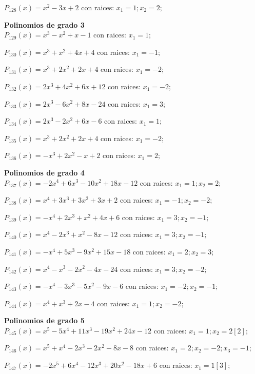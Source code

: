 \subitem $P_{128}(x) = x^2 - 3x + 2$ con raices: $x_1 = 1 ; x_2 = 2 ;  $

\textbf{Polinomios de grado 3\\} 
\subitem $P_{129}(x) = x^3 - x^2 + x - 1$ con raices: $x_1 = 1 ;  $

\subitem $P_{130}(x) = x^3 + x^2 + 4x + 4$ con raices: $x_1 = -1 ;  $

\subitem $P_{131}(x) = x^3 + 2x^2 + 2x + 4$ con raices: $x_1 = -2 ;  $

\subitem $P_{132}(x) = 2x^3 + 4x^2 + 6x + 12$ con raices: $x_1 = -2 ;  $

\subitem $P_{133}(x) = 2x^3 - 6x^2 + 8x - 24$ con raices: $x_1 = 3 ;  $

\subitem $P_{134}(x) = 2x^3 - 2x^2 + 6x - 6$ con raices: $x_1 = 1 ;  $

\subitem $P_{135}(x) = x^3 + 2x^2 + 2x + 4$ con raices: $x_1 = -2 ;  $

\subitem $P_{136}(x) = -x^3 + 2x^2 - x + 2$ con raices: $x_1 = 2 ;  $

\textbf{Polinomios de grado 4\\} 
\subitem $P_{137}(x) = -2x^4 + 6x^3 - 10x^2 + 18x - 12$ con raices: $x_1 = 1 ; x_2 = 2 ;  $

\subitem $P_{138}(x) = x^4 + 3x^3 + 3x^2 + 3x + 2$ con raices: $x_1 = -1 ; x_2 = -2 ;  $

\subitem $P_{139}(x) = -x^4 + 2x^3 + x^2 + 4x + 6$ con raices: $x_1 = 3 ; x_2 = -1 ;  $

\subitem $P_{140}(x) = x^4 - 2x^3 + x^2 - 8x - 12$ con raices: $x_1 = 3 ; x_2 = -1 ;  $

\subitem $P_{141}(x) = -x^4 + 5x^3 - 9x^2 + 15x - 18$ con raices: $x_1 = 2 ; x_2 = 3 ;  $

\subitem $P_{142}(x) = x^4 - x^3 - 2x^2 - 4x - 24$ con raices: $x_1 = 3 ; x_2 = -2 ;  $

\subitem $P_{143}(x) = -x^4 - 3x^3 - 5x^2 - 9x - 6$ con raices: $x_1 = -2 ; x_2 = -1 ;  $

\subitem $P_{144}(x) = x^4 + x^3 + 2x - 4$ con raices: $x_1 = 1 ; x_2 = -2 ;  $

\textbf{Polinomios de grado 5\\} 
\subitem $P_{145}(x) = x^5 - 5x^4 + 11x^3 - 19x^2 + 24x - 12$ con raices: $x_1 = 1 ; x_2 = 2[2] ;  $

\subitem $P_{146}(x) = x^5 + x^4 - 2x^3 - 2x^2 - 8x - 8$ con raices: $x_1 = 2 ; x_2 = -2 ; x_3 = -1 ;  $

\subitem $P_{147}(x) = -2x^5 + 6x^4 - 12x^3 + 20x^2 - 18x + 6$ con raices: $x_1 = 1[3] ;  $

